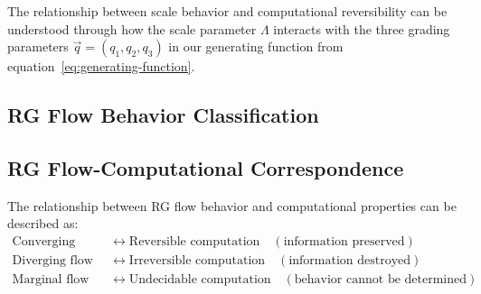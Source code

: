 The relationship between scale behavior and computational reversibility can be understood through how the scale parameter $\Lambda$ interacts with the three grading parameters $\vec{q} = (q_1, q_2, q_3)$ in our generating function from equation~\eqref{eq:generating-function}.

\subsection{RG Flow Behavior Classification}


\subsection{RG Flow-Computational Correspondence}

\begin{theorem}
\label{thm:rg-computational-correspondence}
The relationship between RG flow behavior and computational properties can be described as:
\begin{align}
\text{Converging flow} &\leftrightarrow \text{Reversible computation} \quad (\text{information preserved}) \\
\text{Diverging flow} &\leftrightarrow \text{Irreversible computation} \quad (\text{information destroyed}) \\
\text{Marginal flow} &\leftrightarrow \text{Undecidable computation} \quad (\text{behavior cannot be determined})
\end{align}
\end{theorem}

